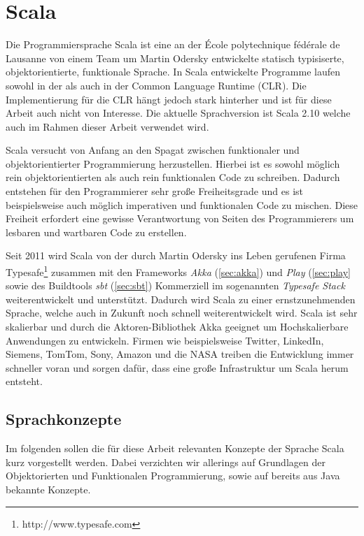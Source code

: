 \section{Scala}

Die Programmiersprache Scala ist eine an der École polytechnique fédérale de  Lausanne von einem
Team um Martin Odersky entwickelte statisch typisiserte,  objektorientierte, funktionale
Sprache. In Scala entwickelte Programme laufen  sowohl in der  als auch in der
Common  Language Runtime (CLR). Die Implementierung für die CLR hängt jedoch stark  hinterher und
ist für diese Arbeit auch nicht von Interesse. Die aktuelle Sprachversion ist Scala 2.10 welche auch
im Rahmen dieser Arbeit verwendet wird.

Scala versucht von Anfang an den Spagat zwischen funktionaler und  objektorientierter Programmierung
herzustellen. Hierbei ist es sowohl möglich  rein objektorientierten als auch rein funktionalen Code
zu schreiben. Dadurch  entstehen für den Programmierer sehr große Freiheitsgrade und es ist
beispielsweise auch möglich imperativen und funktionalen Code zu mischen. Diese  Freiheit erfordert
eine gewisse Verantwortung von Seiten des Programmierers um  lesbaren und wartbaren Code zu
erstellen.

Seit 2011 wird Scala von der durch Martin Odersky ins Leben gerufenen Firma
Typesafe\footnote{http://www.typesafe.com} zusammen mit den Frameworks \textit{Akka}
(\ref{sec:akka}) und \textit{Play} (\ref{sec:play} sowie des Buildtools \textit{sbt} (\ref{sec:sbt})
Kommerziell im sogenannten \textit{Typesafe Stack} weiterentwickelt und unterstützt. Dadurch wird
Scala zu einer ernstzunehmenden Sprache, welche auch in Zukunft noch schnell weiterentwickelt wird.
Scala ist sehr skalierbar und durch die Aktoren-Bibliothek Akka geeignet um Hochskalierbare
Anwendungen zu entwickeln. Firmen wie beispielsweise Twitter, LinkedIn, Siemens, TomTom, Sony,
Amazon und die NASA treiben die Entwicklung immer schneller voran und sorgen dafür, dass eine große
Infrastruktur um Scala herum entsteht. \cite{scala}

\subsection{Sprachkonzepte}

Im folgenden sollen die für diese Arbeit relevanten Konzepte der Sprache Scala kurz vorgestellt
werden. Dabei verzichten wir allerings auf Grundlagen der Objektorierten und Funktionalen
Programmierung, sowie auf bereits aus Java bekannte Konzepte.

